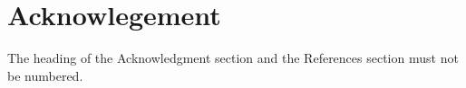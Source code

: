 \documentclass{siintec}
\begin{document}

\section*{Acknowlegement}
The heading of the Acknowledgment section and the References section must not be numbered.




\end{document}
